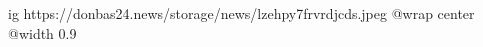  
 
 
 
 

\ifcmt
  ig https://donbas24.news/storage/news/lzehpy7frvrdjcds.jpeg
  @wrap center
  @width 0.9
\fi

